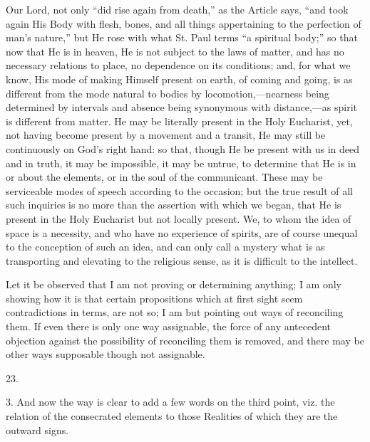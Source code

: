 Our Lord, not only ``did rise again from death,''
as the Article says, ``and took again His Body with flesh, bones, and
all things appertaining to the perfection of man's nature,'' but He
rose with what St. Paul terms ``a spiritual body;'' so that now that He
is in heaven, He is not subject to the laws of matter, and has no
necessary relations to place, no dependence on its conditions; and,
for what we know, His mode of making Himself present on earth, of
coming and going, is as different from the mode natural to bodies by
locomotion,—nearness being determined by intervals and absence being
synonymous with distance,—as spirit is different from matter. He may
be literally present in the Holy Eucharist, yet, not having become
present by a movement and a transit, He may still be continuously on
God's right hand: so that, though He be present with us in deed and in
truth, it may be impossible, it may be untrue, to determine that He is
in or about the elements, or in the soul of the communicant. These may
be serviceable modes of speech according to the occasion; but
the true result of all such inquiries is no more than the assertion
with which we began, that He is present in the Holy Eucharist but not
locally present. We, to whom the idea of space is a necessity, and who
have no experience of spirits, are of course unequal to the conception
of such an idea, and can only call a mystery what is as transporting
and elevating to the religious sense, as it is difficult to the
intellect.

Let it be observed that I am not proving or
determining anything; I am only showing how it is that certain
propositions which at first sight seem contradictions in terms, are
not so; I am but pointing out ways of reconciling them. If even there
is only one way assignable, the force of any antecedent objection
against the possibility of reconciling them is removed, and there may
be other ways supposable though not assignable.

23.

3. And now the way is clear to add a few words on
the third point, viz. the relation of the consecrated elements to
those Realities of which they are the outward signs.

